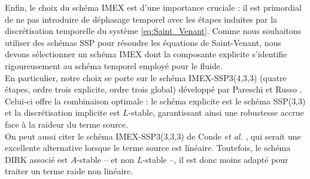 \documentclass[11pt, a4paper, oneside]{report}
\begin{document}
\begin{samepage}
Enfin, le choix du schéma IMEX est d'une importance cruciale : il est primordial de ne pas introduire de déphasage temporel avec les étapes induites par la discrétisation temporelle du système \eqref{eq:Saint_Venant}. Comme nous souhaitons utiliser des schémas SSP pour résoudre les équations de Saint-Venant, nous devons sélectionner un schéma IMEX dont la composante explicite s'identifie rigoureusement au schéma temporel employé pour le fluide. \\
En particulier, notre choix se porte sur le schéma IMEX-SSP3(4,3,3) (quatre étapes, ordre trois explicite, ordre trois global) développé par Pareschi et Russo \cite{pareschi2005implicit}. Celui-ci offre la combinaison optimale : le schéma explicite est le schéma SSP(3,3) et la discrétisation implicite est $L$-stable, garantissant ainsi une robustesse accrue face à la raideur du terme source. \\
On peut aussi citer le schéma IMEX-SSP3(3,3,3) de Conde \textit{et al.} \cite{conde2017implicit}, qui serait une excellente alternative lorsque le terme source est linéaire. Toutefois, le schéma DIRK associé est $A$-stable -- et non $L$-stable --, il est donc moins adapté pour traiter un terme raide non linéaire. \\


\end{samepage}
\end{document}
